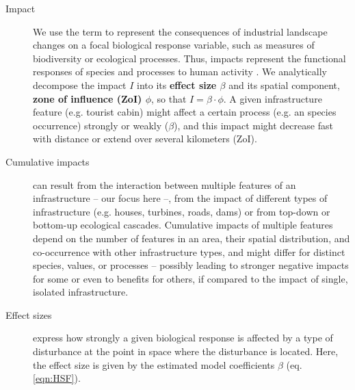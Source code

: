 \documentclass[titlepage]{article}
\begin{document}
\begin{tcolorbox}[width=1.3\textwidth,center,colback=yellow!5,colframe=yellow!75!black,title={Box 1 -- Definitions}]

\begin{description}

    \item[Impact] We use the term to represent the consequences of industrial landscape changes on a focal biological response variable, such as measures of biodiversity or ecological processes. Thus, impacts represent the functional responses of species and processes to human activity \citep{naugle_unifying_2011}. We analytically decompose the impact $I$ into its \textbf{effect size $\beta$} and its spatial component, \textbf{zone of influence (ZoI) $\phi$}, so that $I = \beta \cdot \phi$. A given infrastructure feature (e.g. tourist cabin) might affect a certain process (e.g. an species occurrence) strongly or weakly ($\beta$), and this impact might decrease fast with distance or extend over several kilometers (ZoI).
    
    \item[Cumulative impacts] can result from the interaction between multiple features of an infrastructure -- our focus here --, from the impact of different types of infrastructure (e.g. houses, turbines, roads, dams) or from top-down or bottom-up ecological cascades. Cumulative impacts of multiple features depend on the number of features in an area, their spatial distribution, and co-occurrence with other infrastructure types, and might differ for distinct species, values, or processes -- possibly leading to stronger negative impacts for some or even to benefits for others, if compared to the impact of single, isolated infrastructure.
    
    \item[Effect sizes] express how strongly a given biological response is affected by a type of disturbance at the point in space where the disturbance is located. Here, the effect size is given by the estimated model coefficients $\beta$ (eq. \ref{eqn:HSF}).
    

\end{description}
\end{tcolorbox}
\end{document}
